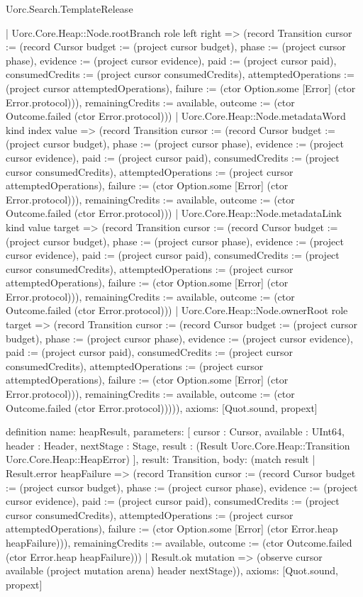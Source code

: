 \begin{lexlean}{Uorc.Search.TemplateRelease}
\begin{semanticmodule}
{      | Uorc.Core.Heap::Node.rootBranch role left right => (record Transition {cursor := (record Cursor {budget := (project cursor budget), phase := (project cursor phase), evidence := (project cursor evidence), paid := (project cursor paid), consumedCredits := (project cursor consumedCredits), attemptedOperations := (project cursor attemptedOperations), failure := (ctor Option.some [Error] (ctor Error.protocol))}), remainingCredits := available, outcome := (ctor Outcome.failed (ctor Error.protocol))})
      | Uorc.Core.Heap::Node.metadataWord kind index value => (record Transition {cursor := (record Cursor {budget := (project cursor budget), phase := (project cursor phase), evidence := (project cursor evidence), paid := (project cursor paid), consumedCredits := (project cursor consumedCredits), attemptedOperations := (project cursor attemptedOperations), failure := (ctor Option.some [Error] (ctor Error.protocol))}), remainingCredits := available, outcome := (ctor Outcome.failed (ctor Error.protocol))})
      | Uorc.Core.Heap::Node.metadataLink kind value target => (record Transition {cursor := (record Cursor {budget := (project cursor budget), phase := (project cursor phase), evidence := (project cursor evidence), paid := (project cursor paid), consumedCredits := (project cursor consumedCredits), attemptedOperations := (project cursor attemptedOperations), failure := (ctor Option.some [Error] (ctor Error.protocol))}), remainingCredits := available, outcome := (ctor Outcome.failed (ctor Error.protocol))})
      | Uorc.Core.Heap::Node.ownerRoot role target => (record Transition {cursor := (record Cursor {budget := (project cursor budget), phase := (project cursor phase), evidence := (project cursor evidence), paid := (project cursor paid), consumedCredits := (project cursor consumedCredits), attemptedOperations := (project cursor attemptedOperations), failure := (ctor Option.some [Error] (ctor Error.protocol))}), remainingCredits := available, outcome := (ctor Outcome.failed (ctor Error.protocol))}))),
  axioms: [Quot.sound, propext]
}

definition{
  name: heapResult,
  parameters: [
    cursor : Cursor,
    available : UInt64,
    header : Header,
    nextStage : Stage,
    result : (Result Uorc.Core.Heap::Transition Uorc.Core.Heap::HeapError)
  ],
  result: Transition,
  body: (match result
    | Result.error heapFailure => (record Transition {cursor := (record Cursor {budget := (project cursor budget), phase := (project cursor phase), evidence := (project cursor evidence), paid := (project cursor paid), consumedCredits := (project cursor consumedCredits), attemptedOperations := (project cursor attemptedOperations), failure := (ctor Option.some [Error] (ctor Error.heap heapFailure))}), remainingCredits := available, outcome := (ctor Outcome.failed (ctor Error.heap heapFailure))})
    | Result.ok mutation => (observe cursor available (project mutation arena) header nextStage)),
  axioms: [Quot.sound, propext]
}


\end{semanticmodule}
\end{lexlean}
